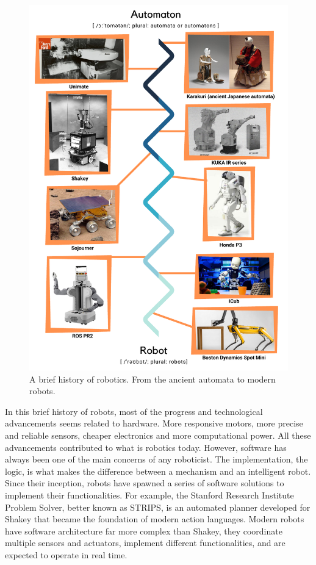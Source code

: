 \begin{figure}
    \centering
    \includegraphics[width=\textwidth]{gfx/history}
    \caption{A brief history of robotics. From the ancient automata to modern robots.}\label{fig:history}
\end{figure}

In this brief history of robots, most of the progress and technological advancements seems related to hardware. More responsive motors, more precise and reliable sensors, cheaper electronics and more computational power. All these advancements contributed to what is robotics today. However, software has always been one of the main concerns of any roboticist. The implementation, the logic, is what makes the difference between a mechanism and an intelligent robot. Since their inception, robots have spawned a series of software solutions to implement their functionalities. For example, the Stanford Research Institute Problem Solver, better known as STRIPS, is an automated planner developed for Shakey that became the foundation of modern action languages. Modern robots have software architecture far more complex than Shakey, they coordinate multiple sensors and actuators,  implement different functionalities, and are expected to operate in real time.


